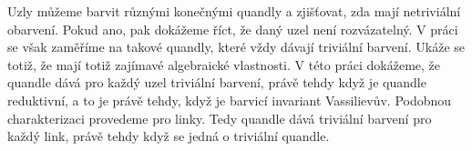 \documentclass[12pt]{report}
\begin{document}

Uzly můžeme barvit různými konečnými quandly a zjišťovat, zda mají netriviální obarvení. Pokud ano, pak
dokážeme říct, že daný uzel není rozvázatelný. V práci se však zaměříme na takové quandly, které vždy dávají
triviální barvení. Ukáže se totiž, že mají totiž zajímavé algebraické vlastnosti. V této práci dokážeme,
že quandle dává pro každý uzel triviální barvení, právě tehdy když je quandle reduktivní, a to je právě tehdy,
když je barvicí invariant Vassilievův. Podobnou charakterizaci provedeme pro linky. Tedy quandle dává triviální
barvení pro každý link, právě tehdy když se jedná o triviální quandle.
\end{document}
